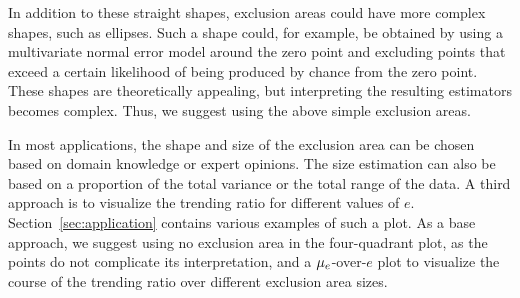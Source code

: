 In addition to these straight shapes, exclusion areas could have more complex shapes, such as ellipses.
Such a shape could, for example, be obtained by using a multivariate normal error model around the zero point and excluding points that exceed a certain likelihood of being produced by chance from the zero point.
These shapes are theoretically appealing, but interpreting the resulting estimators becomes complex.
Thus, we suggest using the above simple exclusion areas.

In most applications, the shape and size of the exclusion area can be chosen based on domain knowledge or expert opinions.
The size estimation can also be based on a proportion of the total variance or the total range of the data.
A third approach is to visualize the trending ratio for different values of $e$.
Section~\ref{sec:application} contains various examples of such a plot.
As a base approach, we suggest using no exclusion area in the four-quadrant plot, as the points do not complicate its interpretation, and a $\mu_{e}$-over-$e$ plot to visualize the course of the trending ratio over different exclusion area sizes.


